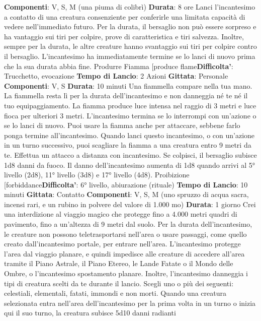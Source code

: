 \begin{multicols}{2}
\textbf{Componenti}: V, S, M (una piuma di colibrì)
\textbf{Durata}: 8 ore
Lanci l’incantesimo a contatto di una creatura
consenziente per conferirle una limitata capacità di
vedere nell’immediato futuro. Per la durata, il bersaglio
non può essere sorpreso e ha vantaggio sui tiri per
colpire, prove di caratteristica e tiri salvezza. Inoltre,
sempre per la durata, le altre creature hanno
svantaggio sui tiri per colpire contro il bersaglio.
L’incantesimo ha immediatamente termine se lo lanci di
nuovo prima che la sua durata abbia fine.
Produrre Fiamma
[produce flame\textbf{Difficolta'}:
Trucchetto, evocazione
\textbf{Tempo di Lancio}: 2 Azioni
\textbf{Gittata}: Personale
\textbf{Componenti}: V, S
\textbf{Durata}: 10 minuti
Una fiammella compare nella tua mano. La fiammella
resta lì per la durata dell’incantesimo e non danneggia
né te né il tuo equipaggiamento. La fiamma produce
luce intensa nel raggio di 3 metri e luce fioca per
ulteriori 3 metri. L’incantesimo termina se lo interrompi
con un’azione o se lo lanci di nuovo.
Puoi usare la fiamma anche per attaccare, sebbene
farlo ponga termine all’incantesimo. Quando lanci
questo incantesimo, o con un’azione in un turno
successivo, puoi scagliare la fiamma a una creatura
entro 9 metri da te. Effettua un attacco a distanza con
incantesimo. Se colpisci, il bersaglio subisce 1d8 danni
da fuoco.
Il danno dell’incantesimo aumenta di 1d8 quando arrivi
al 5° livello (2d8), 11° livello (3d8) e 17° livello (4d8).
Proibizione
[forbiddance\textbf{Difficolta'}:
6° livello, abiurazione (rituale)
\textbf{Tempo di Lancio}: 10 minuti
\textbf{Gittata}: Contatto
\textbf{Componenti}: V, S, M (uno spruzzo di acqua sacra,
incensi rari, e un rubino in polvere del valore di 1.000
mo)
\textbf{Durata}: 1 giorno
Crei una interdizione al viaggio magico che protegge
fino a 4.000 metri quadri di pavimento, fino a un’altezza
di 9 metri dal suolo. Per la durata dell’incantesimo, le
creature non possono teletrasportarsi nell’area o usare
passaggi, come quello creato dall’incantesimo portale,
per entrare nell’area. L’incantesimo protegge l’area dal
viaggio planare, e quindi impedisce alle creature di
accedere all’area tramite il Piano Astrale, il Piano
Etereo, le Lande Fatate o il Mondo delle Ombre, o
l’incantesimo spostamento planare.
Inoltre, l’incantesimo danneggia i tipi di creatura scelti
da te durante il lancio. Scegli uno o più dei seguenti:
celestiali, elementali, fatati, immondi e non morti.
Quando una creatura selezionata entra nell’area
dell’incantesimo per la prima volta in un turno o inizia
qui il suo turno, la creatura subisce 5d10 danni radianti

\end{multicols}

